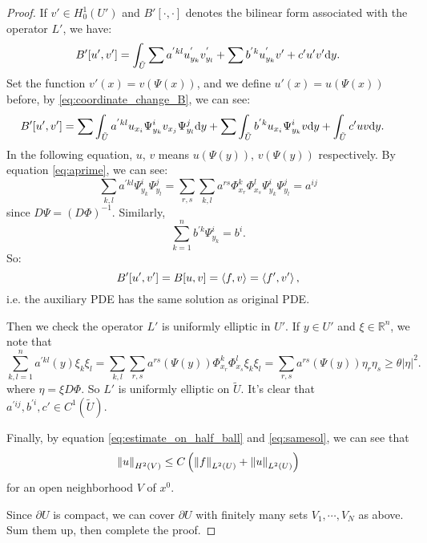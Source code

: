 \begin{proof}
    If $v'\in H_{0}^{1}(U')$ and $B'[\cdot,\cdot]$ denotes the bilinear form associated with the operator $L'$, we have:
    \begin{equation}
        \label{eq:coordinate_change_B}
        B'[u',v']=\int_{\tilde{U}}\sum a^{'kl}u_{y_k}^{'}v_{y_l}^{'}+\sum b^{'k}u_{y_k}^{'}v'+c'u'v'\mathrm{d} y. 
    \end{equation}
    Set the function $v'(x)=v(\Psi(x))$, and we define $u'(x)=u(\Psi(x))$ before, by \eqref{eq:coordinate_change_B}, we can see:
    \begin{equation}
        \label{eq:form_of_B}
        \begin{aligned}
            B'[u',v']&=\sum\int_{\tilde{U}}a^{'kl}u_{x_{i}}\Psi_{y_{k}}^{i}v_{x_{j}}\Psi_{y_{l}}^{j}\mathrm{d} y+\sum\int_{\tilde{U}}b^{'k}u_{x_{i}}\Psi_{y_{k}}^{i}v\mathrm{d} y+\int_{\tilde{U}}c'uv\mathrm{d} y.
        \end{aligned}
    \end{equation}
    In the following equation, $u$, $v$ means $u(\Psi(y))$, $v(\Psi(y))$ respectively. By equation \eqref{eq:aprime}, we can see:
    \begin{equation}
        \sum_{k,l}a^{'kl}\Psi_{y_{k}}^{i}\Psi_{y_{l}}^{j}=\sum_{r,s}\sum_{k,l}a^{rs}\Phi_{x_{r}}^{k}\Phi_{x_{s}}^{l}\Psi_{y_{k}}^{i}\Psi_{y_{l}}^{j}=a^{ij}
    \end{equation}
    since $D\Psi=(D\Phi)^{-1}$. Similarly,
    \begin{equation}
        \sum_{k=1}^{n}b^{'k}\Psi_{y_{k}}^{i}=b^{i}.
    \end{equation}
    So:
    \begin{equation}
        \label{eq:samesol}
        B'[u',v']=B[u,v]=\left<f,v\right>=\left<f',v'\right>,
    \end{equation}
    i.e. the auxiliary PDE has the same solution as original PDE.

    Then we check the operator $L'$ is uniformly elliptic in $U'$. If $y\in U'$ and $\xi\in\mathbb{R}^{n}$, we note that 
    \begin{equation}
        \sum_{k,l=1}^{n}a^{'kl}(y)\xi_{k}\xi_{l}=\sum_{k,l}\sum_{r,s}a^{rs}(\Psi(y))\Phi_{x_{r}}^{k}\Phi_{x_{s}}^{l}\xi_{k}\xi_{l}=\sum_{r,s}a^{rs}(\Psi(y))\eta_{r}\eta_{s}\ge\theta|\eta|^{2}.
    \end{equation}
    where $\eta=\xi D\Phi$. So $L'$ is uniformly elliptic on $\tilde{U}$. It's clear that $a^{'ij},b^{'i},c'\in C^{1}(\tilde{U})$.

    Finally, by equation \eqref{eq:estimate_on_half_ball} and \eqref{eq:samesol}, we can see that 
    \begin{equation}
        \left\|u\right\|_{H^{2}(V)}\le C\left(\left\|f\right\|_{L^{2}(U)}+\left\|u\right\|_{L^{2}(U)}\right)
    \end{equation}
    for an open neighborhood $V$ of $x^{0}$. 

    Since $\partial U$ is compact, we can cover $\partial U$ with finitely many sets $V_{1},\cdots, V_{N}$ as above. Sum them up, then complete the proof.
\end{proof}


